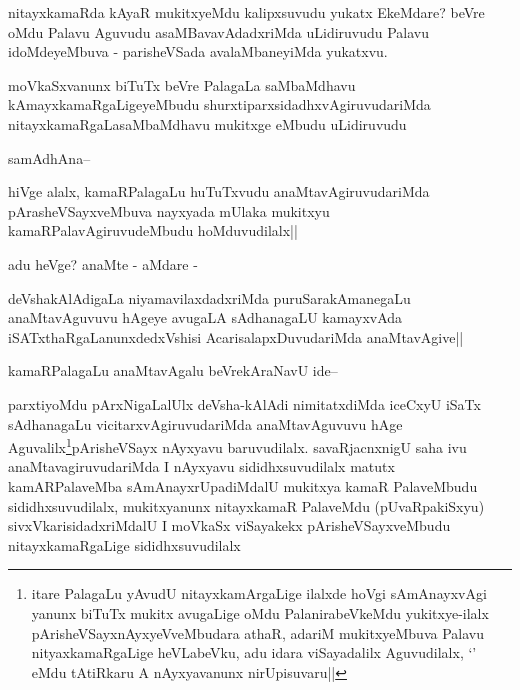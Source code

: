 
\begin{artha}
nitayxkamaRda kAyaR mukitxyeMdu kalipxsuvudu yukatx EkeMdare? beVre oMdu Palavu Aguvudu asaMBavavAdadxriMda uLidiruvudu Palavu idoMdeyeMbuva - parisheVSada avalaMbaneyiMda yukatxvu.
\end{artha}

\begin{artha}
moVkaSxvanunx biTuTx beVre PalagaLa saMbaMdhavu kAmayxkamaRgaLigeyeMbudu shurxtiparxsidadhxvAgiruvudariMda nitayxkamaRgaLasaMbaMdhavu mukitxge eMbudu uLidiruvudu
\end{artha}

\begin{artha}
samAdhAna--
\end{artha}

\begin{artha}
hiVge alalx, kamaRPalagaLu huTuTxvudu anaMtavAgiruvudariMda pArasheVSayxveMbuva nayxyada mUlaka mukitxyu kamaRPalavAgiruvudeMbudu hoMduvudilalx||
\end{artha}

\begin{artha}
adu heVge? anaMte - aMdare -
\end{artha}

\begin{artha}
deVshakAlAdigaLa niyamavilaxdadxriMda puruSarakAmanegaLu anaMtavAguvuvu hAgeye avugaLA sAdhanagaLU kamayxvAda iSATxthaRgaLanunxdedxVshisi AcarisalapxDuvudariMda anaMtavAgive||
\end{artha}

\begin{artha}
kamaRPalagaLu anaMtavAgalu beVrekAraNavU ide--
\end{artha}

\begin{artha}
parxtiyoMdu pArxNigaLalUlx deVsha-kAlAdi nimitatxdiMda iceCxyU iSaTx sAdhanagaLu vicitarxvAgiruvudariMda anaMtavAguvuvu hAge Aguvalilx\footnote{itare PalagaLu yAvudU nitayxkamArgaLige ilalxde hoVgi sAmAnayxvAgi yanunx biTuTx mukitx avugaLige oMdu PalanirabeVkeMdu yukitxye-ilalx pArisheVSayxnAyxyeVveMbudara athaR, adariM mukitxyeMbuva Palavu nityaxkamaRgaLige heVLabeVku, adu idara viSayadalilx Aguvudilalx, `\stext' eMdu tAtiRkaru A nAyxyavanunx nirUpisuvaru||}pArisheVSayx nAyxyavu baruvudilalx. savaRjacnxnigU saha ivu anaMtavagiruvudariMda I nAyxyavu sididhxsuvudilalx matutx kamARPalaveMba sAmAnayxrUpadiMdalU mukitxya kamaR PalaveMbudu sididhxsuvudilalx, mukitxyanunx nitayxkamaR PalaveMdu (pUvaRpakiSxyu) sivxVkarisidadxriMdalU I moVkaSx viSayakekx pArisheVSayxveMbudu nitayxkamaRgaLige sididhxsuvudilalx
\end{artha}

